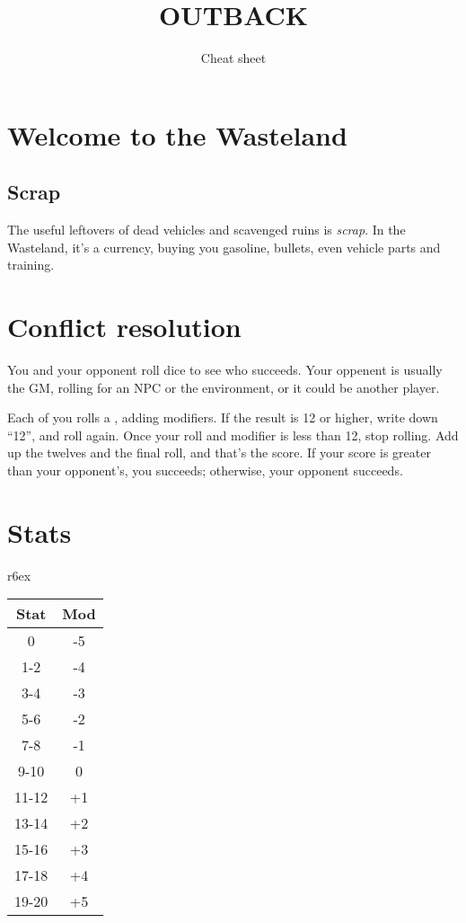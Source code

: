 \documentclass[10pt, a4paper, twocolumn]{article}
\title{\uppercase{Outback}}
\subtitle{Cheat sheet}
\date{}
\begin{document}
\twocolumn[
  \begin{@twocolumnfalse}
    \maketitle
  \end{@twocolumnfalse}
]

\section{Welcome to the Wasteland}

\subsection{Scrap}
The useful leftovers of dead vehicles and scavenged ruins is \emph{scrap}. In
the Wasteland, it's a currency, buying you gasoline, bullets, even vehicle parts
and training.

\section{Conflict resolution}
You and your opponent roll dice to see who succeeds. Your oppenent is usually
the GM, rolling for an NPC or the environment, or it could be another player.

Each of you rolls a , adding modifiers. If the result is 12 or higher,
write down ``12'', and roll again. Once your roll and modifier is less than 12,
stop rolling. Add up the twelves and the final roll, and that's the score. If
your score is greater than your opponent's, you succeeds; otherwise, your
opponent succeeds.

\section{Stats}
\begin{wraptable}[9]{r}{6ex}
  \small
\vspace*{-8ex}
\hspace*{-4.5ex}
\begin{tabular}{cc}
  Stat  & Mod \\
  \hline 
  0     & -5       \\
  1-2   & -4       \\
  3-4   & -3       \\
  5-6   & -2       \\
  7-8   & -1       \\
  9-10  &  0       \\
  11-12 & +1       \\
  13-14 & +2       \\
  15-16 & +3       \\
  17-18 & +4       \\
  19-20 & +5
\end{tabular}
\end{wraptable}
\end{document}
